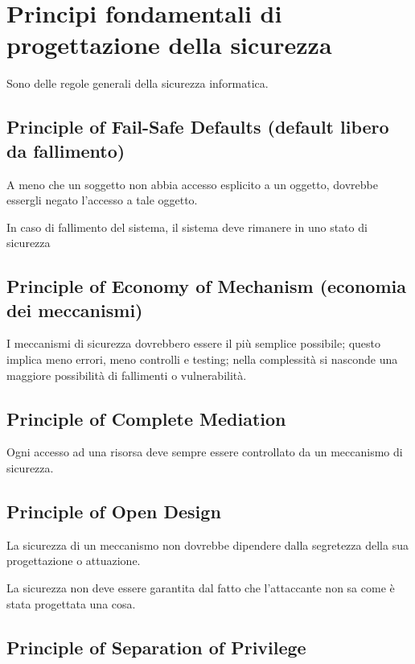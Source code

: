 \section{Principi fondamentali di progettazione della sicurezza}

Sono delle regole generali della sicurezza informatica. 

\subsection{Principle of Fail-Safe Defaults (default libero da fallimento)}

A meno che un soggetto non abbia accesso esplicito a un oggetto, dovrebbe essergli negato l'accesso a tale oggetto.

In caso di fallimento del sistema, il sistema deve rimanere in uno stato di sicurezza

\subsection{Principle of Economy of Mechanism (economia dei meccanismi)}

I meccanismi di sicurezza dovrebbero essere il più semplice possibile; questo implica meno errori, meno controlli e testing; nella complessità si nasconde
 una maggiore possibilità di fallimenti o vulnerabilità.

\subsection{Principle of Complete Mediation}

Ogni accesso ad una risorsa deve sempre essere controllato da un meccanismo di sicurezza.


\subsection{Principle of Open Design}

La sicurezza di un meccanismo non dovrebbe dipendere dalla segretezza della sua progettazione
o attuazione.

La sicurezza non deve essere garantita dal fatto che l'attaccante non sa come è stata progettata una cosa.

\subsection{Principle of Separation of Privilege}

